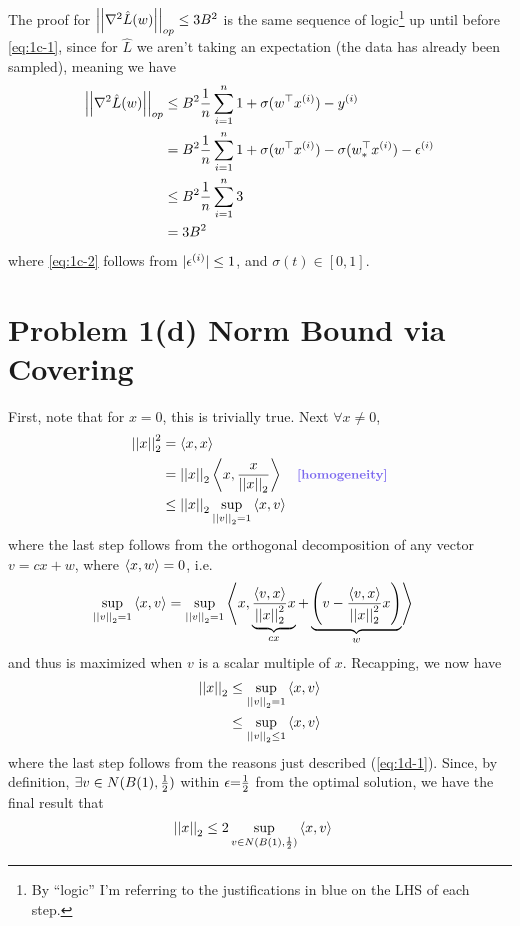 \documentclass[11pt]{article}
\newcommand{\1}{\mathbb{I}} %
\begin{document}
The proof for $\norm[op]{\nabla^2 \hat L(w)} \leq 3 B^2$ is the same sequence of logic\footnote{By ``logic'' I'm referring to the justifications in blue on the LHS of each step.} up until before \ref{eq:1c-1}, since for $\hat L$ we aren't taking an expectation (the data has already been sampled), meaning we have
\begin{align}
	\norm[op]{\nabla^2 \hat L(w)}	
		&\leq B^2  \inv{n} \insum 1 + \sigma(w^\top \ival[i]{x}) - \ival[i]{y} \\
		&= B^2  \inv{n} \insum 1 + \sigma(w^\top \ival[i]{x}) - \sigma(w_*^\top \ival[i]{x}) - \ival[i]{\epsilon} \\
		&\leq B^2 \inv{n} \insum 3 \label{eq:1c-2} \\
		&= 3B^2
\end{align}
where \ref{eq:1c-2} follows from $|\ival[i]{\epsilon}| \leq 1$, and $\sigma(t) \in [0, 1]$. 


\clearpage 
\section*{Problem 1(d) Norm Bound via Covering}


First, note that for $x = 0$, this is trivially true. Next $\forall x \neq 0$,
\begin{align}
	\norm{x}^2 
		&= \innerprod{x}{x} \\
		&= \norm{x} \innerprod{x}{\frac{x}{\norm{x}}} 
			\quad \mtblue{[homogeneity]} \\
		&\leq \norm{x} \sup_{\norm{v} = 1} \innerprod{x}{v}
\end{align}
where the last step follows from the orthogonal decomposition of any vector $v = c x + w$, where $\innerprod{x}{w} = 0$, i.e. 
\begin{align}
	\sup_{\norm{v} = 1} \innerprod{x}{v} 
		&= \sup_{\norm{v} = 1} \innerprod{x}{  \underbrace{\frac{\innerprod{v}{x}}{\norm{x}^2} x}_{cx} 
				+ \underbrace{ \lr{v -  \frac{\innerprod{v}{x}}{\norm{x}^2} x} }_{w} } \label{eq:1d-1}
\end{align}
and thus is maximized when $v$ is a scalar multiple of $x$. Recapping, we now have 
\begin{align}
	\norm{x}
		&\leq \sup_{\norm{v} = 1} \innerprod{x}{v} \\
		&\leq \sup_{\norm{v} \leq 1} \innerprod{x}{v} 
\end{align}
where the last step follows from the reasons just described (\ref{eq:1d-1}). Since, by definition, $\exists v \in N(B(1), \onehalf)$ within $\epsilon \eq \onehalf$ from the optimal solution, we have the final result that 
\begin{align}
	\norm{x}	
		&\leq 2 \sup_{v \in N(B(1), \onehalf)} \innerprod{x}{v}
\end{align}
\end{document}
